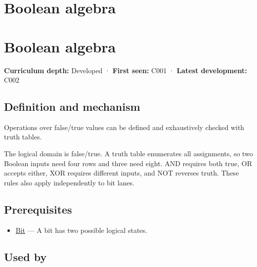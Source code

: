 \hypertarget{appendix-24475e1596a8}{}
\section*{Boolean algebra}
\section{Boolean algebra}\label{appendix-24475e1596a8-boolean-algebra}

\textbf{Curriculum depth:} Developed · \textbf{First seen:} C001 · \textbf{Latest development:} C002

\subsection{Definition and mechanism}\label{appendix-24475e1596a8-definition-and-mechanism}

Operations over false/true values can be defined and exhaustively checked with truth tables.

The logical domain is false/true. A truth table enumerates all assignments, so two Boolean inputs need four rows and three need eight. AND requires both true, OR accepts either, XOR requires different inputs, and NOT reverses truth. These rules also apply independently to bit lanes.

\subsection{Prerequisites}\label{appendix-24475e1596a8-prerequisites}

\begin{itemize}
\tightlist
\item
  \hyperref[appendix-ddbb69998a2e]{Bit} --- A bit has two possible logical states.
\end{itemize}

\subsection{Used by}\label{appendix-24475e1596a8-used-by}

